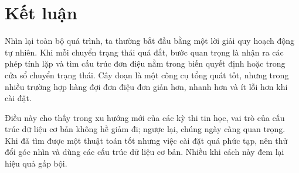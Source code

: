 \documentclass[11pt]{article}
\begin{document}
\section{Kết luận}

Nhìn lại toàn bộ quá trình, ta thường bắt đầu bằng một lời giải quy hoạch
động tự nhiên. Khi mỗi chuyển trạng thái quá đắt, bước quan trọng là nhận ra
các phép tính lặp và tìm cấu trúc đơn điệu nằm trong biến quyết định hoặc
trong cửa sổ chuyển trạng thái. Cây đoạn là một công cụ tổng quát tốt, nhưng
trong nhiều trường hợp hàng đợi đơn điệu đơn giản hơn, nhanh hơn và ít lỗi
hơn khi cài đặt.

Điều này cho thấy trong xu hướng mới của các kỳ thi tin học, vai trò của cấu
trúc dữ liệu cơ bản không hề giảm đi; ngược lại, chúng ngày càng quan trọng.
Khi đã tìm được một thuật toán tốt nhưng việc cài đặt quá phức tạp, nên thử
đổi góc nhìn và dùng các cấu trúc dữ liệu cơ bản. Nhiều khi cách này đem lại
hiệu quả gấp bội.
\end{document}

